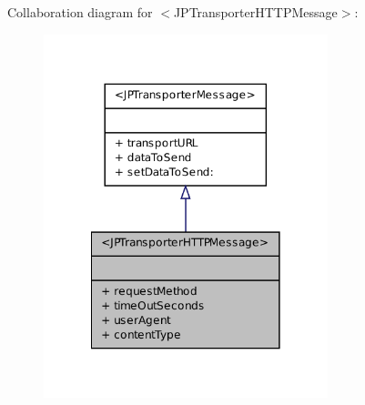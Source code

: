 Collaboration diagram for $<$JPTransporterHTTPMessage$>$:\nopagebreak
\begin{figure}[H]
\begin{center}
\leavevmode
\includegraphics[width=234pt]{a00168}
\end{center}
\end{figure}
